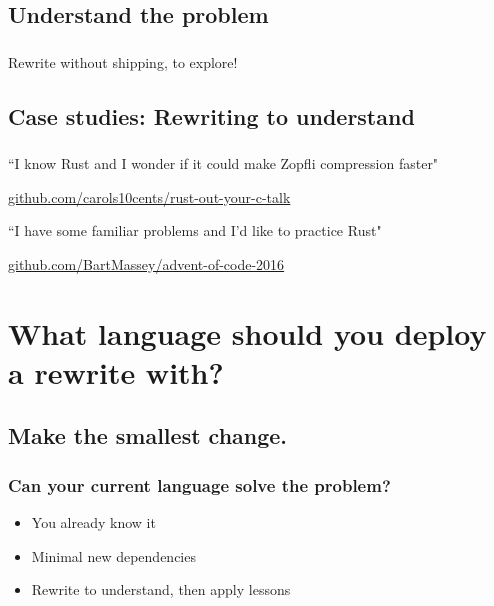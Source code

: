 \documentclass{beamer}
\begin{document}
\subsection{Understand the problem}
\begin{frame}[fragile]
\frametitle{\insertsubsectionhead}
Rewrite without shipping, to explore!
\end{frame}

\subsection{Case studies: Rewriting to understand}

\begin{frame}[fragile]
\frametitle{\insertsubsectionhead}

``I know Rust and I wonder if it could make Zopfli compression faster"

\url{github.com/carols10cents/rust-out-your-c-talk}


``I have some familiar problems and I'd like to practice Rust"

\url{github.com/BartMassey/advent-of-code-2016}

\end{frame}

\section{What language should you deploy a rewrite with?}

\begin{frame}[fragile]
\tableofcontents [currentsection, currentsubsection, sectionstyle=shaded, subsectionstyle=shaded]
\end{frame}

\subsection{Make the smallest change.}

\begin{frame}[fragile]
\frametitle{Can your current language solve the problem?}
\begin{itemize}
\item You already know it
\item Minimal new dependencies
\item Rewrite to understand, then apply lessons
\end{itemize}
\end{frame}
\end{document}
